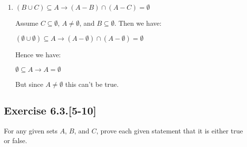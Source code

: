 \documentclass{article}
\newcommand{\cent}[1]{\begin{center}#1\end{center}}
\newcommand{\Exercise}[1]{\subsection{Exercise #1}}
\begin{document}
\begin{enumerate}
		\item $ (B \cup C) \subseteq A \to (A-B) \cap (A-C) = \emptyset $
		
		Assume $C \subseteq \emptyset$, $A \neq \emptyset$, and $B \subseteq \emptyset$. Then we have:
		
		\cent{$ (\emptyset \cup \emptyset) \subseteq A \to (A-\emptyset) \cap (A-\emptyset) = \emptyset $}
		
		Hence we have:
		
		\cent{$ \emptyset \subseteq A \to A = \emptyset $}
		
		But since $A \neq \emptyset$ this can't be true.
		
 	\end{enumerate}
 	
 	\Exercise{6.3.[5-10]}
 	
 	For any given sets $A$, $B$, and $C$, prove each given statement that it is either true or false.
 	
\end{document}
